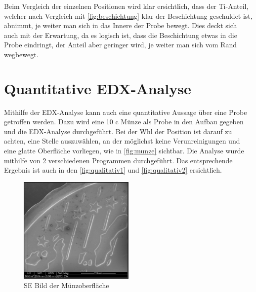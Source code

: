 \documentclass[12pt,english,ngerman]{scrartcl}
\begin{document}
Beim Vergleich der einzelnen Positionen wird klar ersichtlich, dass der
Ti-Anteil, welcher nach Vergleich mit \autoref{fig:beschichtung} klar der
Beschichtung geschuldet ist, abnimmt, je weiter man sich in das Innere der
Probe bewegt. Dies deckt sich auch mit der Erwartung, da es logisch ist, dass
die Beschichtung etwas in die Probe eindringt, der Anteil aber geringer wird,
je weiter man sich vom Rand wegbewegt.

\section{Quantitative EDX-Analyse}

Mithilfe der EDX-Analyse kann auch eine quantitative Aussage über eine Probe
getroffen werden. Dazu wird eine 10 c Münze als Probe in den Aufbau gegeben und
die EDX-Analyse durchgeführt. Bei der Whl der Position ist darauf zu achten,
eine Stelle auszuwählen, an der möglichst keine Verunreinigungen und eine
glatte Oberfläche vorliegen, wie in \autoref{fig:munze} sichtbar. Die Analyse
wurde mithilfe von 2 verschiedenen Programmen durchgeführt. Das entsprechende
Ergebnis ist auch in den \autoref{fig:qualitativ1} und
\autoref{fig:qualitativ2} ersichtlich.

\begin{figure}[H]
	\begin{center}
		\includegraphics[width =0.5\textwidth]{./figures/munze.png}
	\end{center}
	\caption{SE Bild der Münzoberfläche~\cite{sein_foto}
	}\label{fig:munze}
\end{figure}
\end{document}
